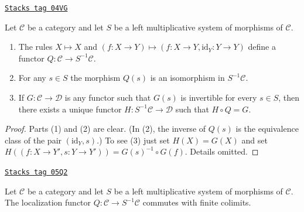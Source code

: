 \begin{lemma}
\label{categories-lemma-properties-left-localization}
\href{https://stacks.math.columbia.edu/tag/04VG}{\texttt{Stacks tag 04VG}}

Let $\mathcal{C}$ be a category and let $S$ be a left multiplicative
system of morphisms of $\mathcal{C}$.
\begin{enumerate}
\item The rules $X \mapsto X$ and
$(f : X \to Y) \mapsto (f : X \to Y, \text{id}_Y : Y \to Y)$
define a functor $Q : \mathcal{C} \to S^{-1}\mathcal{C}$.
\item For any $s \in S$ the morphism $Q(s)$ is an isomorphism in
$S^{-1}\mathcal{C}$.
\item If $G : \mathcal{C} \to \mathcal{D}$ is any functor such that
$G(s)$ is invertible for every $s \in S$, then there exists a
unique functor $H : S^{-1}\mathcal{C} \to \mathcal{D}$
such that $H \circ Q = G$.
\end{enumerate}
\end{lemma}

\begin{proof}
Parts (1) and (2) are clear. (In (2), the inverse of $Q(s)$ is
the equivalence class of the pair $(\text{id}_Y, s)$.)
To see (3) just set $H(X) = G(X)$
and set $H((f : X \to Y', s : Y \to Y')) = G(s)^{-1} \circ G(f)$.
Details omitted.
\end{proof}

\begin{lemma}
\label{categories-lemma-left-localization-limits}
\href{https://stacks.math.columbia.edu/tag/05Q2}{\texttt{Stacks tag 05Q2}}

Let $\mathcal{C}$ be a category and let $S$ be a left multiplicative
system of morphisms of $\mathcal{C}$. The localization functor
$Q : \mathcal{C} \to S^{-1}\mathcal{C}$ commutes with finite colimits.
\end{lemma}

